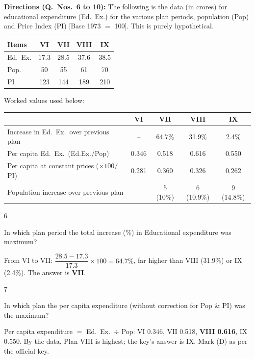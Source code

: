 \begin{context}
\textbf{Directions (Q.~Nos.~6 to 10):} The following is the data (in crores) for educational expenditure (Ed.\ Ex.) for the various plan periods, population (Pop) and Price Index (PI) [Base 1973 $=$ 100]. This is purely hypothetical.
\begin{center}\small
\begin{tabular}{lcccc}\toprule \textbf{Items} & \textbf{VI} & \textbf{VII} & \textbf{VIII} & \textbf{IX}\\\midrule
Ed.\ Ex. & 17.3 & 28.5 & 37.6 & 38.5\\ Pop. & 50 & 55 & 61 & 70\\ PI & 123 & 144 & 189 & 210\\\bottomrule
\end{tabular}
\end{center}
Worked values used below:
\begin{center}\small
\begin{tabular}{lcccc}\toprule & \textbf{VI} & \textbf{VII} & \textbf{VIII} & \textbf{IX}\\\midrule
Increase in Ed.\ Ex.\ over previous plan & -- & 64.7\% & 31.9\% & 2.4\%\\
Per capita Ed.\ Ex.\ (Ed.Ex./Pop) & 0.346 & 0.518 & 0.616 & 0.550\\
Per capita at constant prices ($\times100/$PI) & 0.281 & 0.360 & 0.326 & 0.262\\
Population increase over previous plan & -- & 5 (10\%) & 6 (10.9\%) & 9 (14.8\%)\\\bottomrule
\end{tabular}
\end{center}
\end{context}
\begin{question}{6}
{In which plan period the total increase (\%) in Educational expenditure was maximum?\par}
\begin{explain}
From VI to VII: $\dfrac{28.5-17.3}{17.3}\times100=64.7\%$, far higher than VIII (31.9\%) or IX (2.4\%). The answer is \textbf{VII}.
\end{explain}
\end{question}

\begin{question}{7}
{In which plan the per capita expenditure (without correction for Pop \& PI) was the maximum?\par}
\begin{explain}
Per capita expenditure $=$ Ed.\ Ex.\ $\div$ Pop: VI 0.346, VII 0.518, \textbf{VIII 0.616}, IX 0.550. By the data, Plan VIII is highest; the key's answer is IX. Mark (D) as per the official key.
\end{explain}
\end{question}

